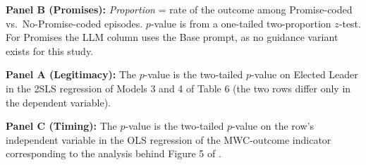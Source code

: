 \begin{table}[ht]
\begin{threeparttable}
{\begin{tabular}{l@{\hskip 24pt} c@{\hskip 10pt}c @{\hskip 24pt} c@{\hskip 10pt}c @{\hskip 24pt} c@{\hskip 10pt}c}
\bottomrule
\end{tabular}
}
\vspace{8pt}
\begin{tablenotes}[flushleft]\footnotesize
\setlength{\itemsep}{6pt}
\item \textbf{Panel B (Promises):} \textit{Proportion} = rate of the outcome among Promise-coded vs.\ No-Promise-coded episodes. \(p\)-value is from a one-tailed two-proportion \(z\)-test. For Promises the LLM column uses the Base prompt, as no guidance variant exists for this study.
\item \textbf{Panel A (Legitimacy):} The \(p\)-value is the two-tailed \(p\)-value on Elected Leader in the 2SLS regression of Models 3 and 4 of Table 6 (the two rows differ only in the dependent variable).
\item \textbf{Panel C (Timing):} The \(p\)-value is the two-tailed \(p\)-value on the row's independent variable in the OLS regression of the MWC-outcome indicator corresponding to the analysis behind Figure 5 of \cite{BH_JEP_2023}.
\end{tablenotes}
\end{threeparttable}
\end{table}
